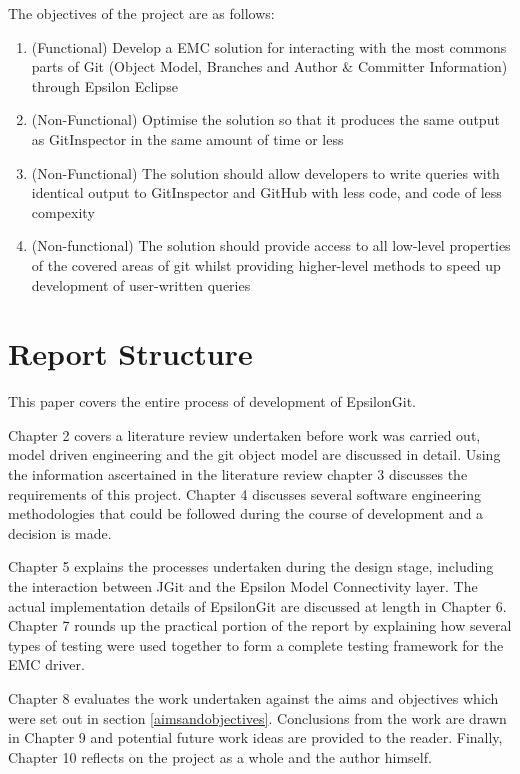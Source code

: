 \documentclass[11pt]{book}
\begin{document}
The objectives of the project are as follows:

\begin{enumerate}
	\item (Functional) Develop a EMC solution for interacting with the most commons parts of Git (Object Model, Branches and Author \& Committer Information) through Epsilon Eclipse
	\item (Non-Functional) Optimise the solution so that it produces the same output as GitInspector in the same amount of time or less 
	\item (Non-Functional) The solution should allow developers to write queries with identical output to GitInspector and GitHub with less code, and code of less compexity
	\item (Non-functional) The solution should provide access to all low-level properties of the covered areas of git whilst providing higher-level methods to speed up development of user-written queries
\end{enumerate}

\section{Report Structure}

This paper covers the entire process of development of EpsilonGit.

Chapter 2 covers a literature review undertaken before work was carried out, model driven engineering and the git object model are discussed in detail. Using the information ascertained in the literature review chapter 3 discusses the requirements of this project. Chapter 4 discusses several software engineering methodologies that could be followed during the course of development and a decision is made.

Chapter 5 explains the processes undertaken during the design stage, including the interaction between JGit and the Epsilon Model Connectivity layer. The actual implementation details of EpsilonGit are discussed at length in Chapter 6. Chapter 7 rounds up the practical portion of the report by explaining how several types of testing were used together to form a complete testing framework for the EMC driver.

Chapter 8 evaluates the work undertaken against the aims and objectives which were set out in section \ref{aimsandobjectives}. Conclusions from the work are drawn in Chapter 9 and potential future work ideas are provided to the reader. Finally, Chapter 10 reflects on the project as a whole and the author himself.  
\end{document}
